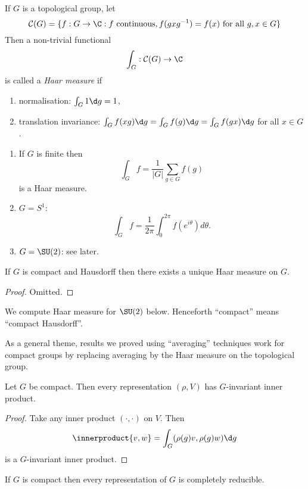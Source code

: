 \documentclass[a4paper]{article}
\newcommand*{\ip}{\innerproduct} %
\theoremstyle{definition}
\begin{document}
\begin{definition}
  If \(G\) is a topological group, let
  \[
    \mathcal C(G) = \{f: G \to \C: f \text{ continuous}, f(gxg^{-1}) = f(x) \text{ for all } g, x \in G\}
  \]
  Then a non-trivial functional
  \[
    \int_G: \mathcal C(G) \to \C
  \]
  is called a \emph{Haar measure} if
  \begin{enumerate}
  \item normalisation: \(\int_G 1 \d g = 1\),
  \item translation invariance: \(\int_G f(xg) \d g = \int_G f(g) \d g = \int_G f(gx) \d g\) for all \(x \in G\).
  \end{enumerate}
\end{definition}

\begin{eg}\leavevmode
  \begin{enumerate}
  \item If \(G\) is finite then
    \[
      \int_G f = \frac{1}{|G|} \sum_{g \in G} f(g)
    \]
    is a Haar measure.
  \item \(G = S^1\):
    \[
      \int_G f = \frac{1}{2\pi} \int_0^{2\pi} f(e^{i\theta}) d\theta.
    \]
  \item \(G = \SU(2)\): see later.
  \end{enumerate}
\end{eg}

\begin{theorem}
  If \(G\) is compact and Hausdorff then there exists a unique Haar measure on \(G\).
\end{theorem}

\begin{proof}
  Omitted.
\end{proof}

We compute Haar measure for \(\SU(2)\) below. Henceforth ``compact'' means ``compact Hausdorff''.

As a general theme, results we proved using ``averaging'' techniques work for compact groups by replacing averaging by the Haar measure on the topological group.

\begin{corollary}
  Let \(G\) be compact. Then every representation \((\rho, V)\) has \(G\)-invariant inner product.
\end{corollary}

\begin{proof}
  Take any inner product \((\cdot, \cdot)\) on \(V\). Then
  \[
    \ip{v, w} = \int_G (\rho(g) v, \rho(g) w) \d g
  \]
  is a \(G\)-invariant inner product.
\end{proof}

\begin{corollary}[Maschke]
  If \(G\) is compact then every representation of \(G\) is completely reducible.
\end{corollary}




  




\printindex
\end{document}
